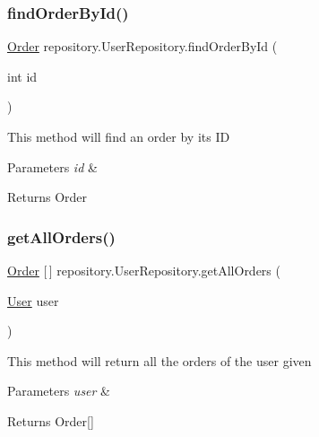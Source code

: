 \subsubsection{\texorpdfstring{find\+Order\+By\+Id()}{findOrderById()}}
{\footnotesize\ttfamily \mbox{\hyperlink{classentity_1_1_order}{Order}} repository.\+User\+Repository.\+find\+Order\+By\+Id (\begin{DoxyParamCaption}\item[{int}]{id }\end{DoxyParamCaption})\hspace{0.3cm}{\ttfamily [inline]}}

This method will find an order by its ID 
\begin{DoxyParams}{Parameters}
{\em id} & ~\newline
\\
\hline
\end{DoxyParams}
\begin{DoxyReturn}{Returns}
Order 
\end{DoxyReturn}
\mbox{\label{classrepository_1_1_user_repository_a56980daa937375f2c13ceb712a08aace}} 
\subsubsection{\texorpdfstring{get\+All\+Orders()}{getAllOrders()}}
{\footnotesize\ttfamily \mbox{\hyperlink{classentity_1_1_order}{Order}} \mbox{[}$\,$\mbox{]} repository.\+User\+Repository.\+get\+All\+Orders (\begin{DoxyParamCaption}\item[{\mbox{\hyperlink{classentity_1_1_user}{User}}}]{user }\end{DoxyParamCaption})\hspace{0.3cm}{\ttfamily [inline]}}

This method will return all the orders of the user given 
\begin{DoxyParams}{Parameters}
{\em user} & ~\newline
\\
\hline
\end{DoxyParams}
\begin{DoxyReturn}{Returns}
Order\mbox{[}\mbox{]} 
\end{DoxyReturn}
\mbox{\label{classrepository_1_1_user_repository_a91aaaa79a8c1be15fc6111a9467c981e}} 
